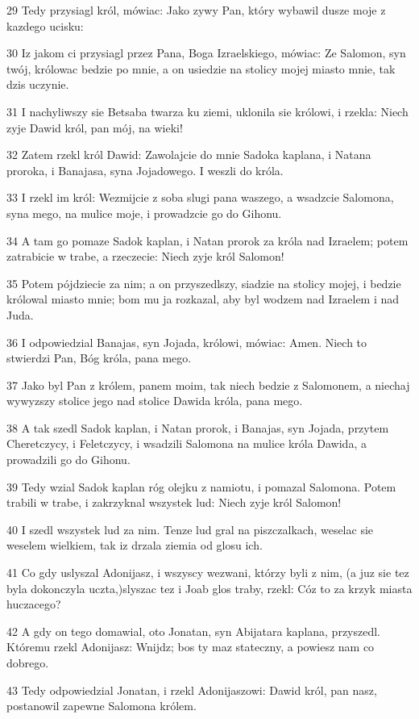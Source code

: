 \par 29 Tedy przysiagl król, mówiac: Jako zywy Pan, który wybawil dusze moje z kazdego ucisku:
\par 30 Iz jakom ci przysiagl przez Pana, Boga Izraelskiego, mówiac: Ze Salomon, syn twój, królowac bedzie po mnie, a on usiedzie na stolicy mojej miasto mnie, tak dzis uczynie.
\par 31 I nachyliwszy sie Betsaba twarza ku ziemi, uklonila sie królowi, i rzekla: Niech zyje Dawid król, pan mój, na wieki!
\par 32 Zatem rzekl król Dawid: Zawolajcie do mnie Sadoka kaplana, i Natana proroka, i Banajasa, syna Jojadowego. I weszli do króla.
\par 33 I rzekl im król: Wezmijcie z soba slugi pana waszego, a wsadzcie Salomona, syna mego, na mulice moje, i prowadzcie go do Gihonu.
\par 34 A tam go pomaze Sadok kaplan, i Natan prorok za króla nad Izraelem; potem zatrabicie w trabe, a rzeczecie: Niech zyje król Salomon!
\par 35 Potem pójdziecie za nim; a on przyszedlszy, siadzie na stolicy mojej, i bedzie królowal miasto mnie; bom mu ja rozkazal, aby byl wodzem nad Izraelem i nad Juda.
\par 36 I odpowiedzial Banajas, syn Jojada, królowi, mówiac: Amen. Niech to stwierdzi Pan, Bóg króla, pana mego.
\par 37 Jako byl Pan z królem, panem moim, tak niech bedzie z Salomonem, a niechaj wywyzszy stolice jego nad stolice Dawida króla, pana mego.
\par 38 A tak szedl Sadok kaplan, i Natan prorok, i Banajas, syn Jojada, przytem Cheretczycy, i Feletczycy, i wsadzili Salomona na mulice króla Dawida, a prowadzili go do Gihonu.
\par 39 Tedy wzial Sadok kaplan róg olejku z namiotu, i pomazal Salomona. Potem trabili w trabe, i zakrzyknal wszystek lud: Niech zyje król Salomon!
\par 40 I szedl wszystek lud za nim. Tenze lud gral na piszczalkach, weselac sie weselem wielkiem, tak iz drzala ziemia od glosu ich.
\par 41 Co gdy uslyszal Adonijasz, i wszyscy wezwani, którzy byli z nim, (a juz sie tez byla dokonczyla uczta,)slyszac tez i Joab glos traby, rzekl: Cóz to za krzyk miasta huczacego?
\par 42 A gdy on tego domawial, oto Jonatan, syn Abijatara kaplana, przyszedl. Któremu rzekl Adonijasz: Wnijdz; bos ty maz stateczny, a powiesz nam co dobrego.
\par 43 Tedy odpowiedzial Jonatan, i rzekl Adonijaszowi: Dawid król, pan nasz, postanowil zapewne Salomona królem.
